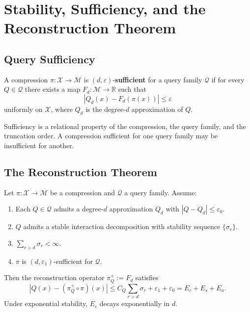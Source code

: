 \chapter{Stability, Sufficiency, and the Reconstruction Theorem}

\section{Query Sufficiency}

\begin{definition}
A compression $\pi : \mathcal{X} \to \mathcal{M}$ is $(d, \varepsilon)$-\textbf{sufficient} for a query family $\mathcal{Q}$ if for every $Q \in \mathcal{Q}$ there exists a map $F_d : \mathcal{M} \to \mathbb{R}$ such that
\[
  |Q_d(x) - F_d(\pi(x))| \leq \varepsilon
\]
uniformly on $\mathcal{X}$, where $Q_d$ is the degree-$d$ approximation of $Q$.
\end{definition}

Sufficiency is a relational property of the compression, the query family, and the truncation order. A compression sufficient for one query family may be insufficient for another.

\section{The Reconstruction Theorem}

\begin{theorem}
\label{thm:reconstruction}
Let $\pi : \mathcal{X} \to \mathcal{M}$ be a compression and $\mathcal{Q}$ a query family. Assume:
\begin{enumerate}
  \item Each $Q \in \mathcal{Q}$ admits a degree-$d$ approximation $Q_d$ with $|Q - Q_d| \leq \varepsilon_0$.
  \item $Q$ admits a stable interaction decomposition with stability sequence $\{\sigma_r\}$.
  \item $\sum_{r>d} \sigma_r < \infty$.
  \item $\pi$ is $(d, \varepsilon_1)$-sufficient for $\mathcal{Q}$.
\end{enumerate}
Then the reconstruction operator $\pi^+_Q := F_d$ satisfies
\[
  |Q(x) - (\pi^+_Q \circ \pi)(x)| \leq C_Q \sum_{r>d} \sigma_r + \varepsilon_1 + \varepsilon_0 = E_c + E_s + E_a.
\]
Under exponential stability, $E_c$ decays exponentially in $d$.
\end{theorem}

